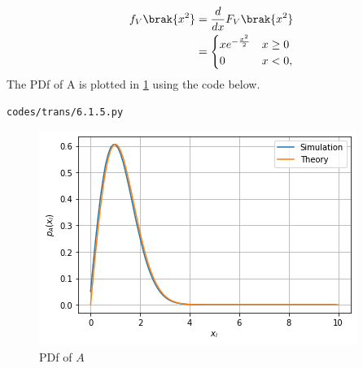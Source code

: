 \begin{enumerate}[label=\thesubsection.\arabic*.,ref=\thesubsection.\theenumi]
\begin{align}
f_V\brak{x^2} &= \frac{d}{dx}F_V\brak{x^2}
\\
&=
\begin{cases}
x e^{- \frac{x^2}{2}} & x \geq 0 \\
0 & x < 0,
\end{cases}
\end{align}
%
The PDf of A is plotted in \ref{fig:probman_trans_pdf_A_theory} using the code below.
\begin{lstlisting}
codes/trans/6.1.5.py
\end{lstlisting}
\begin{figure}[!ht]
\centering
\includegraphics[width=\columnwidth]{figs/trans/6.1.5.png}
\caption{PDf of $A$}
\label{fig:probman_trans_pdf_A_theory}
\end{figure}
\end{enumerate}

%
